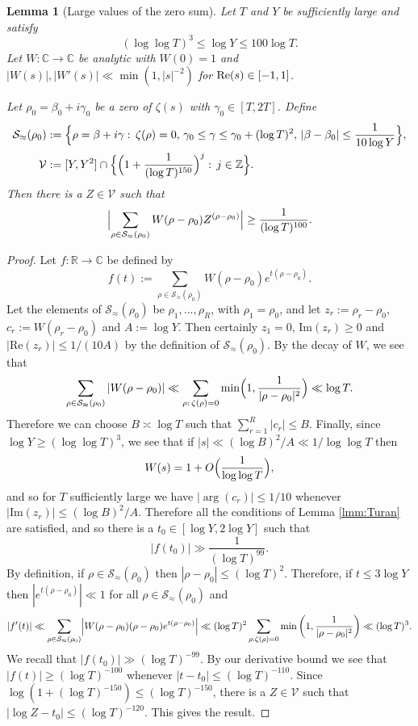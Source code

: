 \documentclass[12pt]{amsart}
\theoremstyle{plain}
\newtheorem{lemma}[theorem]{Lemma}
\theoremstyle{definition}
\theoremstyle{remark}
\begin{document}
\begin{lemma}[Large values of the zero sum]\label{lmm:ZeroSum}
Let $T$ and $Y$ be sufficiently large and satisfy
\[
(\log\log{T})^{3}\le \log{Y}\le 100\log{T}.
\]
Let $W:\mathbb{C}\rightarrow\mathbb{C}$ be analytic with $W(0)=1$ and $|W(s)|,|W'(s)|\ll \min(1,|s|^{-2})$ for $\textup{Re}(s)\in[-1,1]$.

Let $\rho_0=\beta_0+i\gamma_0$ be a zero of $\zeta(s)$ with $\gamma_0\in[T,2T]$. Define
\begin{align*}
\mathcal{S}_{\approx}(\rho_0)&:=\Bigl\{\rho=\beta+i\gamma:\,\zeta(\rho)=0,\,\gamma_0\le \gamma\le \gamma_0+(\log{T})^2,\, |\beta-\beta_0|\le \frac{1}{10\log{Y}}\Bigr\},\\
\mathcal{V}&:=[Y,Y^2]\cap \Bigl\{\Bigl(1+\frac{1}{(\log{T})^{150}}\Bigr)^j:\,j\in\mathbb{Z}\Bigr\}.
\end{align*}
Then  there is a $Z\in\mathcal{V}$ such that
\[
\Bigl|\sum_{\rho\in \mathcal{S}_{\approx}(\rho_0)}W(\rho-\rho_0)Z^{(\rho-\rho_0)}\Bigr|\ge \frac{1}{(\log{T})^{100}}.
\]
\end{lemma}
%
%
%
%
\begin{proof}
Let $f:\mathbb{R}\rightarrow\mathbb{C}$ be defined by
\[
f(t):=\sum_{\rho\in \mathcal{S}_{\approx}(\rho_0)}W(\rho-\rho_0)e^{t(\rho-\rho_0)}.
\]
Let the elements of $\mathcal{S}_{\approx}(\rho_0)$ be $\rho_1,\dots,\rho_R$, with $\rho_1=\rho_0$, and let $z_r:=\rho_r-\rho_0$, $c_r:=W(\rho_r-\rho_0)$ and $A:=\log{Y}$. Then certainly $z_1=0$, $\text{Im}(z_r)\ge 0$ and $|\text{Re}(z_r)|\le 1/(10A)$ by the definition of $\mathcal{S}_{\approx}(\rho_0)$. By the decay of $W$, we see that
\[
\sum_{\rho\in \mathcal{S}_{\approx}(\rho_0)}|W(\rho-\rho_0)|\ll \sum_{\rho:\,\zeta(\rho)=0}\min\Bigl(1,\frac{1}{|\rho-\rho_0|^2}\Bigr)\ll \log{T}.
\]
Therefore we can choose $B\asymp \log{T}$ such that $\sum_{r=1}^R|c_r|\le B$. Finally, since $\log{Y}\ge (\log\log{T})^3$, we see that if $|s|\ll (\log{B})^2/A \ll 1/\log \log T$ then
\[
W(s)=1+O\Bigl(\frac{1}{\log\log{T}}\Bigr),
\]
and so for $T$ sufficiently large we have $|\arg(c_r)|\le 1/10$ whenever $|\text{Im}(z_r)|\le (\log{B})^2/A$. Therefore all the conditions of Lemma \ref{lmm:Turan} are satisfied, and so there is a $t_0\in[\log{Y},2\log{Y}]$ such that
\[
|f(t_0)|\gg \frac{1}{(\log{T})^{99}}.
\]
By definition, if $\rho\in \mathcal{S}_{\approx}(\rho_0)$ then $|\rho-\rho_0|\le (\log{T})^2$. Therefore, if $t\leq 3 \log Y$ then $|e^{t(\rho-\rho_0)}| \ll 1$ for all $\rho \in \mathcal{S}_\approx(\rho_0)$ and
\begin{align*}
|f'(t)|\ll \sum_{\rho\in \mathcal{S}_{\approx}(\rho_0)}\Bigl|W(\rho-\rho_0)(\rho-\rho_0)e^{t(\rho-\rho_0)}\Bigr|\ll (\log T)^2 \sum_{\rho : \zeta(\rho) = 0} \min \left(1, \frac{1}{|\rho-\rho_0|^2}\right) \ll (\log T)^3.
\end{align*}
We recall that $|f(t_0)|\gg (\log{T})^{-99}$. By our derivative bound we see that $|f(t)|\ge (\log{T})^{-100}$ whenever $|t-t_0|\le (\log{T})^{-110}$. Since $\log(1+(\log{T})^{-150})\le (\log{T})^{-150}$, there is a $Z\in \mathcal{V}$ such that $|\log{Z}-t_0|\le (\log{T})^{-120}$. This gives the result.
\end{proof}
\end{document}
